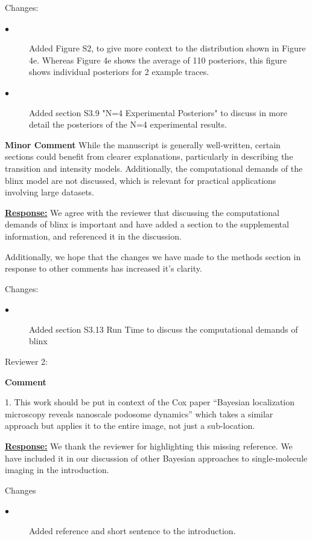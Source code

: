 \documentclass{article}
\begin{document}
Changes:
\begin{description}
    \item[$\bullet$] Added Figure S2, to give more context to the distribution shown in Figure 4e. Whereas Figure 4e 
    shows the average of 110 posteriors, this figure shows individual posteriors for 2 example traces.
    \item[$\bullet$] Added section S3.9 "N=4 Experimental Posteriors" to discuss in more detail the posteriors of the N=4 experimental results.
\end{description}

\textbf{Minor Comment}
While the manuscript is generally well-written, certain sections could benefit from clearer 
explanations, particularly in describing the transition and intensity models. Additionally, 
the computational demands of the blinx model are not discussed, which is relevant for practical 
applications involving large datasets.

\underline{\textbf{Response:}}
We agree with the reviewer that discussing the computational demands of blinx is important and
have added a section to the supplemental information, and referenced it in the discussion.

Additionally, we hope that the changes we have made to the methods section in response to other 
comments has increased it's clarity.

Changes:
\begin{description}
    \item[$\bullet$] Added section S3.13 Run Time to discuss the computational demands of blinx
\end{description}

Reviewer 2:

\textbf{Comment}

1. This work should be put in context of the Cox paper 
“Bayesian localization microscopy reveals nanoscale podosome dynamics” 
which takes a similar approach but applies it to the entire image, not just a sub-location.

\underline{\textbf{Response:}}
We thank the reviewer for highlighting this missing reference. We have included it in our discussion of 
other Bayesian approaches to single-molecule imaging in the introduction.

Changes
\begin{description}
    \item[$\bullet$] Added reference and short sentence to the introduction.
\end{description}
\end{document}
